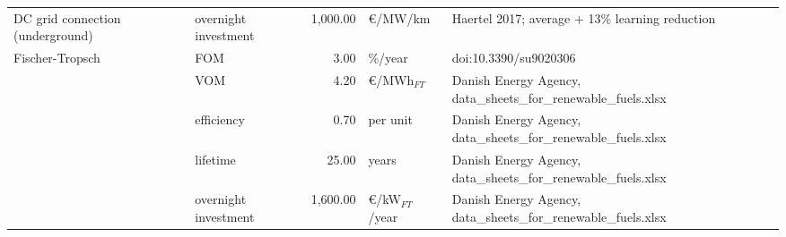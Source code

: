 \begin{longtable}{p{4cm}p{4cm}rp{3cm}p{10cm}}
DC grid connection (underground) & overnight investment &     1,000.00 &                   \euro/MW/km &                                                                                                                                                                                                                                                                                      Haertel 2017; average + 13\% learning reduction \\
Fischer-Tropsch & FOM &         3.00 &                       \%/year &                                                                                                                                                                                                                                                                                                                doi:10.3390/su9020306 \\
                      & VOM &         4.20 &              \euro/MWh$_{FT}$ &                                                                                                                                                                                                                                                                       Danish Energy Agency, data\_sheets\_for\_renewable\_fuels.xlsx \\
                      & efficiency &         0.70 &                      per unit &                                                                                                                                                                                                                                                                       Danish Energy Agency, data\_sheets\_for\_renewable\_fuels.xlsx \\
                      & lifetime &        25.00 &                         years &                                                                                                                                                                                                                                                                       Danish Energy Agency, data\_sheets\_for\_renewable\_fuels.xlsx \\
                      & overnight investment &     1,600.00 &          \euro/kW$_{FT}$/year &                                                                                                                                                                                                                                                                       Danish Energy Agency, data\_sheets\_for\_renewable\_fuels.xlsx \\

\end{longtable}
